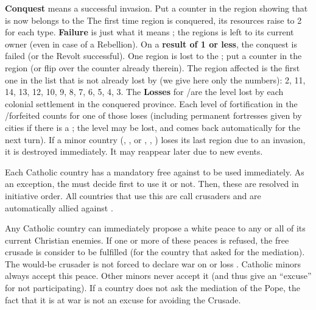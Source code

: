 
\bparag \textbf{Conquest} means a successful invasion. Put a counter in the
region showing that is now belongs to the \paysMogol The first time region
\granderegionBengale is conquered, its resources raise to 2 for each type.
\bparag \textbf{Failure} is just what it means ; the regions is left to its
current owner (even in case of a Rebellion).
\bparag On a \textbf{result of 1 or less}, the conquest is failed (or the
Revolt successful). One region is lost to the \paysMogol; put a \paysMogol
{} counter in the region (or flip over the counter
already therein). The region affected is the first one in the list that is not
already lost by \paysMogol (we give here only the numbers): 2, 11, 14, 13, 12,
10, 9, 8, 7, 6, 5, 4, 3.
\bparag The \textbf{Losses} for \TP/\COL are the level lost by each colonial
settlement in the conquered province. Each level of fortification in the
\TP/\COL forfeited counts for one of those loses (including permanent
fortresses given by cities if there is a \COL; the level may be lost, and
comes back automatically for the next turn).
\bparag If a minor country (\paysGujerat, \paysVijayanagar, or \paysAfghans,
\paysMysore, \paysHyderabad) loses its last region due to an invasion, it is
destroyed immediately. It may reappear later due to new events.






\phevnt
{} Each Catholic country has a mandatory free \CB
against \TUR to be used immediately.
\bparag As an exception, the \SDCF must decide first to use it or not. Then,
these \CB are resolved in initiative order.
\bparag All countries that use this \CB are call crusaders and are
automatically allied against \TUR.

 Any Catholic country can immediately propose a
white peace to any or all of its current Christian enemies.
\bparag If one or more of these peaces is refused, the free crusade \CB is
consider to be fulfilled (for the country that asked for the mediation). The
would-be crusader is not forced to declare war on \TUR or loss \STAB.
\bparag Catholic minors always accept this peace. Other minors never accept it
(and thus give an ``excuse'' for not participating).
\bparag If a country does not ask the mediation of the Pope, the fact that it
is at war is not an excuse for avoiding the Crusade.

